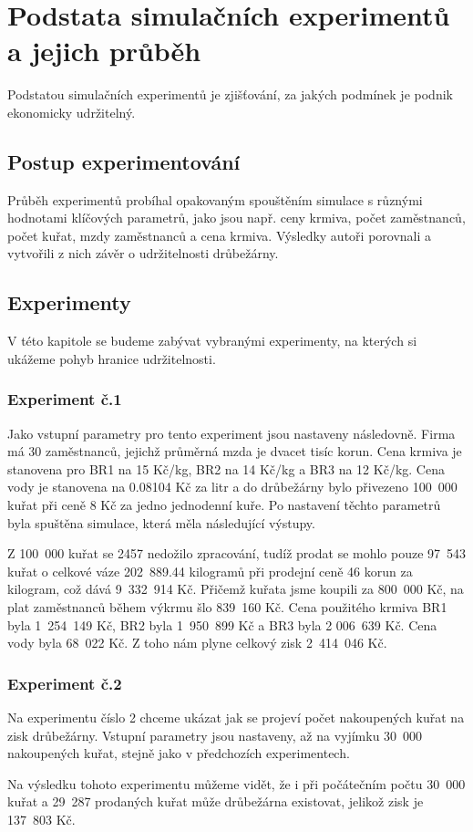 \documentclass[a4paper,10pt]{article}
\begin{document}
\section{Podstata simulačních experimentů a jejich průběh}\label{experimenty}
Podstatou simulačních experimentů je zjišťování, za jakých podmínek je podnik ekonomicky udržitelný.
\subsection{Postup experimentování}
Průběh experimentů probíhal opakovaným spouštěním simulace s různými hodnotami klíčových parametrů, jako
jsou např. ceny krmiva, počet zaměstnanců, počet kuřat, mzdy zaměstnanců a cena krmiva.
Výsledky autoři porovnali a vytvořili z nich závěr o udržitelnosti drůbežárny.

\subsection{Experimenty}
V této kapitole se budeme zabývat vybranými experimenty, na kterých si ukážeme pohyb hranice udržitelnosti.
\subsubsection{Experiment č.1}
Jako vstupní parametry pro tento experiment jsou nastaveny následovně.
Firma má 30 zaměstnanců, jejichž průměrná mzda je dvacet tisíc korun.
Cena krmiva je stanovena pro BR1 na 15 Kč/kg, BR2 na 14 Kč/kg a BR3 na 12 Kč/kg.
Cena vody je stanovena na 0.08104 Kč za litr a do drůbežárny bylo přivezeno 100~000 kuřat při 
ceně 8 Kč za jedno jednodenní kuře.
Po nastavení těchto parametrů byla spuštěna simulace, která měla následující výstupy.
\par
Z 100~000 kuřat se 2457 nedožilo zpracování, tudíž prodat se mohlo pouze 97~543 kuřat o celkové
váze 202~889.44 kilogramů při prodejní ceně 46 korun za kilogram, což dává 9~332~914 Kč.
Přičemž kuřata jsme koupili za 800~000 Kč, na plat zaměstnanců během výkrmu šlo 839~160 Kč.
Cena použitého krmiva BR1 byla 1~254~149 Kč, BR2 byla 1~950~899 Kč a BR3 byla 2 006~639 Kč.
Cena vody byla 68~022 Kč. Z toho nám plyne celkový zisk 2~414~046 Kč.
\subsubsection{Experiment č.2}
Na experimentu číslo 2 chceme ukázat jak se projeví počet nakoupených kuřat na 
zisk drůbežárny. Vstupní parametry jsou nastaveny, až na vyjímku 30~000 nakoupených kuřat, stejně
jako v předchozích experimentech.
\par
Na výsledku tohoto experimentu můžeme vidět, že i při počátečním počtu 30~000 kuřat 
a 29~287 prodaných kuřat může drůbežárna existovat, jelikož zisk je 137~803 Kč.
\end{document}
